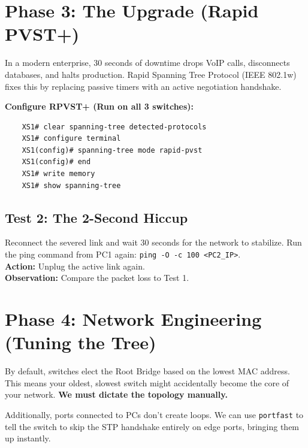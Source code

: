 \documentclass[11pt]{article}
\begin{document}
\section{Phase 3: The Upgrade (Rapid PVST+)}
In a modern enterprise, 30 seconds of downtime drops VoIP calls, disconnects databases, and halts production. Rapid Spanning Tree Protocol (IEEE 802.1w) fixes this by replacing passive timers with an active negotiation handshake.

\noindent\textbf{Configure RPVST+ (Run on all 3 switches):}
\begin{verbatim}
    XS1# clear spanning-tree detected-protocols
    XS1# configure terminal
    XS1(config)# spanning-tree mode rapid-pvst
    XS1(config)# end
    XS1# write memory
    XS1# show spanning-tree
\end{verbatim}

\subsection*{Test 2: The 2-Second Hiccup}
Reconnect the severed link and wait 30 seconds for the network to stabilize. 
Run the ping command from PC1 again: \texttt{ping -O -c 100 <PC2\_IP>}. \\
\textbf{Action:} Unplug the active link again. \\
\textbf{Observation:} Compare the packet loss to Test 1.

\vspace{0.5em}
\noindent {}

\section{Phase 4: Network Engineering (Tuning the Tree)}
By default, switches elect the Root Bridge based on the lowest MAC address. This means your oldest, slowest switch might accidentally become the core of your network. \textbf{We must dictate the topology manually.}

\vspace{1em}
Additionally, ports connected to PCs don't create loops. We can use \texttt{portfast} to tell the switch to skip the STP handshake entirely on edge ports, bringing them up instantly.
\end{document}
